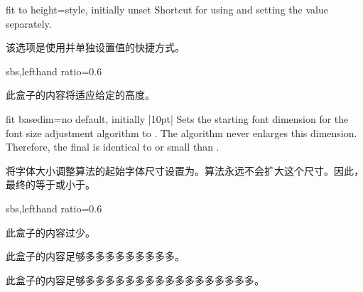 \begin{docTcbKey}{fit to height}{=}{style, initially unset}
Shortcut for using  and setting the  value separately.

该选项是使用并单独设置值的快捷方式。
\begin{dispExample*}{sbs,lefthand ratio=0.6}

\begin{tcolorbox}[fit to height=2cm]
此盒子的内容将适应给定的高度。
\end{tcolorbox}
\end{dispExample*}
\end{docTcbKey}

\begin{docTcbKey}{fit basedim}{=}{no default, initially |10pt|}
Sets the starting font dimension for the font size adjustment algorithm
to . The algorithm never enlarges this dimension.
Therefore, the final  is identical to or small than
.

将字体大小调整算法的起始字体尺寸设置为。算法永远不会扩大这个尺寸。因此，最终的等于或小于。
\begin{dispExample*}{sbs,lefthand ratio=0.6}

\begin{tcolorbox}[fit to=4cm and 2cm]
此盒子的内容过少。
\end{tcolorbox}

\begin{tcolorbox}[fit to=4cm and 2cm,
  fit basedim=50pt]
此盒子的内容足够多多多多多多多多多。
\end{tcolorbox}

\begin{tcolorbox}[fit to=4cm and 2cm,
fit basedim=50pt]
此盒子的内容足够多多多多多多多多多多多多多多多多多。
\end{tcolorbox}
\end{dispExample*}
\end{docTcbKey}